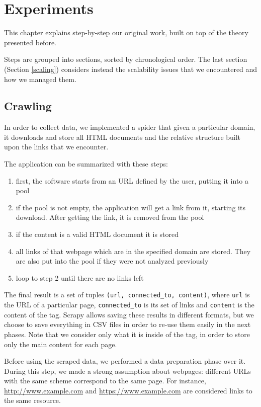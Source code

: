 \chapter{Experiments} \label{experiments}
This chapter explains step-by-step our original work, built on top of the theory presented before.

Steps are grouped into sections, sorted by chronological order.
The last section (Section \ref{scaling}) considers instead the scalability issues that we encountered and how we managed them.



\section{Crawling} \label{crawling}
In order to collect data, 
we implemented a spider that given a particular domain, it downloads and store all HTML documents 
and the relative structure built upon the links that we encounter.

The application can be summarized with these steps:
\begin{enumerate}
    \item first, the software starts from an URL defined by the user, putting it into a pool
    \item if the pool is not empty, the application will get a link from it, starting its download. After getting the link, it is removed from the pool
    \item if the content is a valid HTML document it is stored
    \item all links of that webpage which are in the specified domain are stored. They are also put into the pool if they were not analyzed previously
    \item loop to step 2 until there are no links left
\end{enumerate}

The final result is a set of tuples \texttt{(url, connected\_to, content)}, where \texttt{url} is the URL of a particular page, \texttt{connected\_to} is its set of links and \texttt{content} is the content of the  tag.
Scrapy allows saving these results in different formats, but we choose to save everything in CSV files in order to re-use them easily in the next phases.
Note that we consider only what it is inside of the  tag, in order to store only the main content for each page.

Before using the scraped data, we performed a data preparation phase over it.
During this step, we made a strong assumption about webpages:
different URLs with the same scheme correspond to the same page.
For instance, \url{http://www.example.com} and \url{https://www.example.com}
are considered links to the same resource. 

